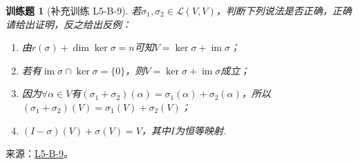 \documentclass[UTF8,12pt,a4paper,fontset=fandol]{ctexart}
\newtheorem{exercise}{训练题}[section]
\begin{document}
\begin{exercise}[补充训练 L5-B-9]\label{prob:L5-B-9}
若$\sigma_1,\sigma_2\in \mathcal{L}(V,V)$，判断下列说法是否正确，正确请给出证明，反之给出反例：
        \begin{enumerate}
            \item 由$r(\sigma)+\dim\ker\sigma=n$可知$V=\ker\sigma+\operatorname{im} \sigma$；

            \item 若有$\operatorname{im} \sigma \cap \ker \sigma = \{0\}$，则$V=\ker\sigma+\operatorname{im} \sigma$成立；

            \item 因为$\forall \alpha \in V$有$(\sigma_1+\sigma_2)(\alpha)=\sigma_1(\alpha)+\sigma_2(\alpha)$，所以$(\sigma_1+\sigma_2)(V)=\sigma_1(V)+\sigma_2(V)$；

            \item $(I-\sigma)(V)+\sigma(V)=V$，其中$I$为恒等映射.
        \end{enumerate}
\end{exercise}
\noindent 来源：\href{https://github.com/yhwu-is/Linear-Algebra-Left-Undone/blob/new/%E8%AE%B2%E4%B9%89/%E4%B8%93%E9%A2%98/5%20%E7%BA%BF%E6%80%A7%E6%98%A0%E5%B0%84.tex}{L5-B-9}。
\end{document}
